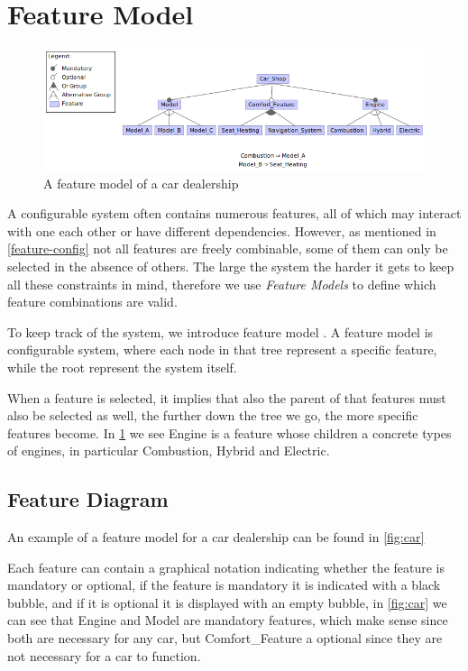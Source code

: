\section{Feature Model}\label{ch:Feature Model}

\begin{figure}[h]
    \centering
    \includegraphics[scale=0.6]{gfx/Car_Shop.png}
    \caption{A feature model of a car dealership}
    \label{fig:car}
\end{figure}

A configurable system often contains numerous features, all of which may interact with one each other or have different dependencies.
However, as mentioned in \autoref{feature-config} not all features are freely combinable, some of them can only be selected in the
absence of others. The large the system the harder it gets to keep all these constraints in mind, therefore we use \emph{Feature Models}
to define which feature combinations are valid.

To keep track of the system, we introduce feature model \cite{Feature-Oriented-Software-Product-Lines-Feature-models}. 
A feature model is  configurable system, where each node in that tree represent a specific feature, while the root
represent the system itself. 

When a feature is selected, it implies that also the parent of that features must also be selected as well, the further
down the tree we go, the more specific features become. In \ref{fig:car} we see Engine is a feature whose children a concrete types
of engines, in particular Combustion, Hybrid and Electric.


\subsection{Feature Diagram}

An example
of a feature model for a car dealership can be found in \autoref{fig:car}


Each feature can contain a graphical notation indicating whether the feature is mandatory or optional, if the feature is mandatory it is 
indicated with a black bubble, and if it is optional it is displayed with an empty bubble, in \autoref{fig:car} we can see that Engine and
Model are mandatory features, which make sense since both are necessary for any car, but Comfort\_Feature a optional since they are not
necessary for a car to function.

